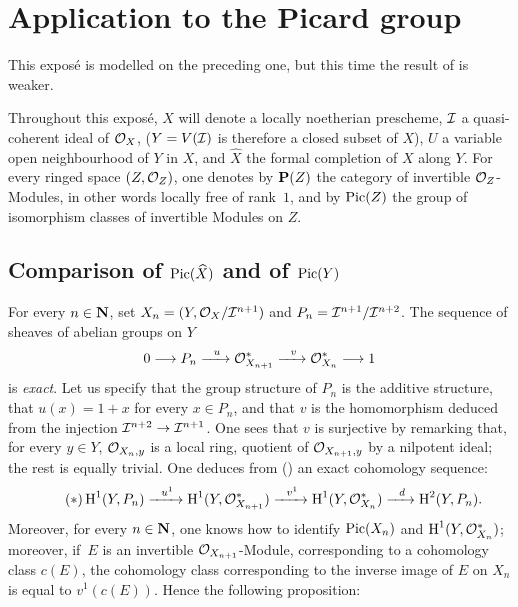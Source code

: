 \chapter{Application to the Picard group} \label{XI}

This expos\'e is modelled on the preceding one, but this time the result of \numero {} is weaker.

Throughout this expos\'e, $X$ will denote a locally noetherian prescheme, ${\mathcal I}$ a quasi-coherent ideal of $\mathcal{O}_X$, ($Y=V({\mathcal I})$ is therefore a closed subset of $X$), $U$ a variable open neighbourhood of $Y$ in $X$, and $\hat X$ the formal completion of $X$ along $Y$. For every ringed space $(Z, {\mathcal O}_Z)$, one denotes by ${\mathbf P}(Z)$\label{pXI.1} the category of invertible ${\mathcal O}_Z$-Modules, in other words locally free of rank~$1$, and by $\operatorname{Pic}(Z)$ the group of isomorphism classes of invertible Modules on $Z$.

\section{Comparison of $\operatorname{Pic}(\widehat X)$ and of $\operatorname{Pic}(Y)$} \label{XI.1}

For every $n\in\mathbf{N}$, set $X_n = (Y, \mathcal{O}_X/{\mathcal I}^{n+1})$ and $P_n = {\mathcal I}^{n+1}/{\mathcal I}^{n+2}$. The sequence of sheaves of abelian groups on $Y$
\begin{equation} \label{eq:XI.1.1} 0\to P_n\lto{u}\Oo_{X_{n+1}}^*\lto{v}\Oo_{X_n}^*\to 1
\end{equation}
is \emph{exact}. Let us specify that the group structure of $P_n$ is the additive structure, that $u(x)=1+x$ for every $x\in P_n$, and that $v$ is the homomorphism deduced from the injection $\Ii^{n+2}\to\Ii^{n+1}$. One sees that $v$ is surjective by remarking that, for every $y \in Y$, ${\mathcal O}_{X_n, y}$ is a local ring, quotient of ${\mathcal O}_{X_{n+1}, y}$ by a nilpotent ideal; the rest is equally trivial. One deduces from () an exact cohomology sequence:
\begin{equation*} \label{eq:XI.1.*} \tag{$*$}
\H^1(Y, P_n)\lto{u^1}\H^1(Y, \Oo_{X_{n+1}}^*)\lto{v^1} \H^1(Y, \Oo_{X_n}^*)\lto{d}\H^2(Y, P_n){\quoi}.
\end{equation*}
Moreover, for every $n\in\mathbf{N}$, one knows how to identify $\operatorname{Pic}(X_n)$ and $\operatorname{H}^1(Y, {\mathcal O}_{X_n}^*)$; moreover, if~$E$ is an invertible ${\mathcal O}_{X_{n+1}}$-Module, corresponding to a cohomology class $c(E)$, the cohomology class corresponding to the inverse image of $E$ on $X_n$ is equal to $v^1(c(E))$. Hence the following proposition:

